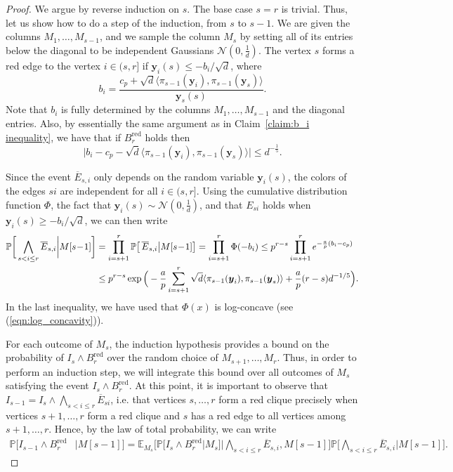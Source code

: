 \documentclass[11pt]{amsart}
\theoremstyle{definition}
\def\cN{\mathcal{N}}
\def\bE{\mathbb{E}}
\def\Pb{\mathbb{P}}
\def\by{\boldsymbol{y}}
\DeclareMathOperator{\red}{red}
\begin{document}
\begin{proof}
We argue by reverse induction on $s$. The base case $s=r$ is trivial. Thus, let us show how to do a step of the induction, from $s$ to $s-1$. We are given the columns $M_1, \dots, M_{s-1}$, and we sample the column $M_s$ by setting all of its entries below the diagonal to be independent Gaussians $\cN(0, \frac{1}{d})$. The vertex $s$ forms a red edge to the vertex $i\in (s, r]$ if $\by_i(s)\leq -b_i/\sqrt{d}$, where 
{\smaller[0.3]
\[b_i=\frac{c_p+\sqrt{d}\langle \pi_{s-1}(\by_i), \pi_{s-1}(\by_s)\rangle}{\by_s(s)}.\]
}
Note that $b_i$ is fully determined by the columns $M_1, \dots, M_{s-1}$ and the diagonal entries. Also, by essentially the same argument as in Claim~\ref{claim:b_i inequality}, we have that if $B^{\red}_r$ holds then
{\smaller[0.3]
\[\big|b_i-c_p-\sqrt{d}\langle \pi_{s-1}(\by_i), \pi_{s-1}(\by_s)\rangle\big|\leq d^{-\frac{1}{5}}.\]
}

Since the event $\overline{E}_{s,i}$ only depends on the random variable $\by_i(s)$, the colors of the edges $si$ are independent for all $i\in (s, r]$. Using the cumulative distribution function $\Phi$, the fact that $\by_i(s)\sim \cN(0, \frac{1}{d})$, and that $E_{si}$ holds when $\by_i(s)\geq -b_i/\sqrt{d}$, we can then write
{\smaller[0.3]
\begin{align}
  \Pb\bigg[\bigwedge_{s<i\leq r}\overline{E}_{s, i}\bigg|M[s\!-\!1]\bigg]&=\prod_{i=s+1}^r \Pb\big[\,\overline{E}_{s, i}\big|M[s\!-\!1]\big]
  =\prod_{i=s+1}^r\Phi(-b_i)
  \leq p^{r-s}\prod_{i=s+1}^r e^{-\frac{a}{p}(b_i-c_p)}\\
  &\leq p^{r-s}\exp\Big(-\frac{a}{p}\sum_{i=s+1}^r\sqrt d\langle\pi_{s-1}(\by_i),\pi_{s-1}(\by_s)\rangle+\frac{a}{p}(r-s)d^{-1/5}\Big).\notag  
\end{align}
}
In the last inequality, we have used that $\Phi(x)$ is log-concave (see (\ref{eqn:log_concavity})).

For each outcome of $M_s$, the induction hypothesis provides a bound on the probability of $I_s\wedge B^{\red}_r$ over the random choice of $M_{s+1}, \dots, M_r$. Thus, in order to perform an induction step, we will integrate this bound over all outcomes of $M_s$ satisfying the event $I_s\wedge B^{\red}_r$. At this point, it is important to observe that $I_{s-1}=I_{s}\wedge \bigwedge_{s<i\leq r}\overline{E}_{si}$, i.e. that vertices $s, \dots, r$ form a red clique precisely when vertices $s+1, \dots, r$ form a red clique and $s$ has a red edge to all vertices among $s+1, \dots, r$. Hence, by the law of total probability, we can write
{\smaller[0.3]
\begin{align}\label{eq:total_probability_red}
\Pb\Big[I_{s -\!1}\wedge B^{\red}_r&\Big| M[s\!-\!1]\Big] =\bE_{M_s}\bigg[\Pb\Big[I_{s}\wedge B^{\red}_r\Big| M_{s}\Big]\bigg| \bigwedge_{s<i\leq r}\overline{E}_{s, i}, M[s\!-\!1]\bigg]\Pb\bigg[\bigwedge_{s<i\leq r}\overline{E}_{s, i}\bigg|M[s\!-\!1]\bigg].
\end{align}
}


\end{proof}
\end{document}
